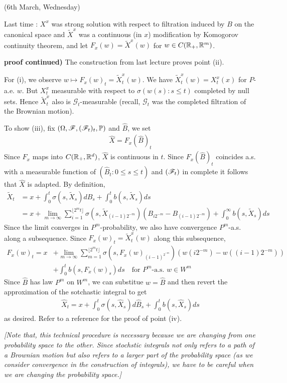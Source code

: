 \documentclass[10pt,a4paper]{article}
\newenvironment{proof}
{\begin{changemargin}{0.5cm}{0.5cm} 
	}%
	{\end{changemargin}
}
\newenvironment{p}
{\begin{proof} 
	}%
	{\end{proof}
}
\begin{document}
\newday

(6th March, Wednesday)
\s

Last time : $X^x$ was strong solution with respect to filtration induced by $B$ on the canonical space and $\tilde{X}^x$ was a continuous (in $x$) modification by Komogorov continuity theorem, and let $F_x(w) = \tilde{X}^x(w)$ for $w\in C(\mathbb{R}_+, \mathbb{R}^m)$.
\s

\begin{p}
\textbf{proof continued)} The construction from last lecture proves point (ii). 

\quad For (i), we observe $w\mapsto F_x(w)_t =\tilde{X}_t^x(w)$. We have $\tilde{X}^x_t(w) = X_t^x(x)$ for $P$-a.e. $w$. But $X_t^x$ measurable with respect to $\sigma(w(s) : s\leq t)$ completed by null sets. Hence $\tilde{X}_t^x$ also is $\mathscr{G}_t$-measurable (recall, $\mathscr{G}_t$ was the completed filtration of the Brownian motion).

\quad To show (iii), fix $(\Omega, \mathscr{F}, (\mathscr{F}_t)_t, \mathbb{P})$ and $\hat{B}$, we set
\begin{align*}
\hat{X} = F_x (\hat{B})_t
\end{align*}
Since $F_x$ maps into $C(\mathbb{R}_+, \mathbb{R}^d)$, $\hat{X}$ is continuous in $t$. Since ${F}_x(\hat{B})_t$ coincides a.s. with a measurable function of $(\hat{B}_t:0\leq s\leq t)$ and $(\mathscr{F}_t)$ in complete it follows that $\hat{X}$ is adapted. By definition, 
\begin{align*}
\tilde{X}_t &= x + \int_0^t \sigma(s, \tilde{X}_s) dB_s + \int_0^t b(s, \tilde{X}_s) ds \\
&= x+ \lim_{m\rightarrow \infty} \sum_{i=1}^{\lfloor 2^m t\rfloor} \sigma(s, \tilde{X}_{(i-1)2^{-m}})(B_{i2^{-m}} - B_{(i-1)2^{-m}}) +\int_0^{\infty} b(s, \tilde{X}_s) ds
\end{align*}
Since the limit converges in $P^m$-probability, we also have convergence $P^m$-a.s. along a subsequence. Since $F_x(w)_t = \tilde{X}_t^x (w)$ along this subsequence,
\begin{align*}
F_x(w)_t = x &+ \lim_{m\rightarrow \infty} \sum_{m=1}^{\lfloor 2^m t\rfloor} \sigma(s, F_x(w)_{(i-1)^{2^{-m}}})(w(i2^{-m}) - w((i-1)2^{-m})) \\
& + \int_0^t b(s, F_x(w)_s) ds \quad \text{for } P^m\text{-a.s. }w\in W^m
\end{align*}
Since $\hat{B}$ has law $P^m$ on $W^m$, we can substitue $w= \hat{B}$ and then revert the approximation of the sotchastic integral to get
\begin{align*}
\hat{X}_t =x + \int_0^t \sigma(s, \hat{X}_s) d\hat{B}_s + \int_0^t b(s, \hat{X}_s) ds
\end{align*}
as desired.
\quad Refer to a reference for the proof of point (iv).

\eop

\emph{[Note that, this technical procedure is necessary because we are changing from one probability space to the other. Since stochstic integrals not only refers to a path of a Brownian motion but also refers to a larger part of the probability space (as we consider convergence in the construction of integrals), we have to be careful when we are changing the probability space.]}
\end{p}
\s
\end{document}
